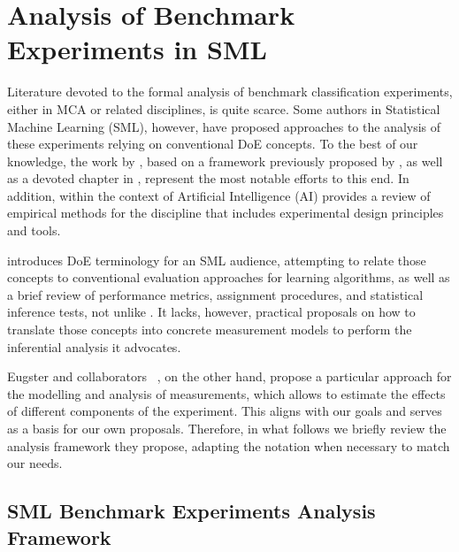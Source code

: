 \section{Analysis of Benchmark Experiments in SML}\label{sec:sml}

Literature devoted to the formal analysis of benchmark classification
experiments, either in MCA or related disciplines, is quite scarce.
%
Some authors in Statistical Machine Learning (SML), however, have proposed 
approaches to the analysis of these experiments relying on conventional DoE
concepts.
%
To the best of our knowledge,
the work by \citet{EugsterPhD, Eugster2008ExpInf},
based on a framework previously proposed by \citet{Hothorn2005DABenchExp},
as well as a devoted chapter in \citet{AlpaydinIML},
represent the most notable efforts to this end.
%
In addition, within the context of Artificial Intelligence (AI)
\citet{CohenEMAI} provides a review of empirical methods
for the discipline that includes experimental design principles
and tools.

\citet{AlpaydinIML} introduces DoE terminology for an SML audience,
attempting to relate those concepts to conventional evaluation approaches
for learning algorithms,
as well as a brief review of performance metrics, assignment procedures,
and statistical inference tests, not unlike \citet{JapkowiczELA}.
%
It lacks, however, practical proposals on how to translate those
concepts into concrete measurement models to perform the inferential
analysis it advocates.

Eugster and collaborators%
~\cite{EugsterPhD, Eugster2008ExpInf, Hothorn2005DABenchExp},
on the other hand, propose a particular approach for 
the modelling and analysis of measurements, which allows to 
estimate the effects of different components of the experiment.
%
This aligns with our goals and serves as a basis for our own
proposals.
%
Therefore, in what follows we briefly review the analysis framework
they propose, adapting the notation when necessary to match our needs.


\subsection{SML Benchmark Experiments Analysis Framework}\label{sec:eugster}


